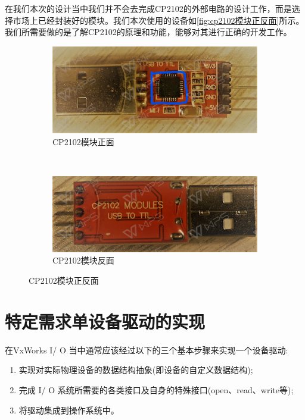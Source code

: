 	在我们本次的设计当中我们并不会去完成CP2102的外部电路的设计工作，而是选择市场上已经封装好的模块。我们本次使用的设备如\autoref{fig:cp2102模块正反面}所示。我们所需要做的是了解CP2102的原理和功能，能够对其进行正确的开发工作。
\begin{figure}[h]
\centering
  \begin{subfigure}[b]{0.4\textwidth}
  \includegraphics[width=\textwidth]{./graphics/cp2102Front.pdf}
  \caption{CP2102模块正面}\label{fig:cp2102Front}
  \end{subfigure}
  ~
  \begin{subfigure}[b]{0.4\textwidth}
  \includegraphics[width=\textwidth]{./graphics/cp2102Rear.pdf}
  \caption{CP2102模块反面}\label{fig:cp2102Rear}
  \end{subfigure}
\caption{CP2102模块正反面}\label{fig:cp2102模块正反面}
\end{figure}
	

\section{特定需求单设备驱动的实现}

	
	在VxWorks I/ O 当中通常应该经过以下的三个基本步骤来实现一个设备驱动:
\begin{enumerate}
\item 实现对实际物理设备的数据结构抽象(即设备的自定义数据结构);
\item 完成 I/ O 系统所需要的各类接口及自身的特殊接口(open、read、write等);
\item 将驱动集成到操作系统中。
\end{enumerate}

